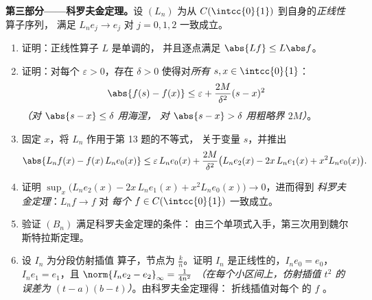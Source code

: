 \begin{problem}
\medskip
\noindent\textbf{第三部分——科罗夫金定理。}设 $(L_n)$
        为从 $C(\intcc{0}{1})$ 到自身的\emph{正线性}算子序列，
        满足 $L_ne_j \to e_j$
        对 $j = 0, 1, 2$ 一致成立。
\begin{enumerate}[resume]
  \item 证明：正线性算子 $L$ 是单调的，
        并且逐点满足 $\abs{Lf} \leq L\abs f$。
  \item 证明：对每个 $\varepsilon > 0$，存在 $\delta > 0$
        使得对\emph{所有} $s, x \in \intcc{0}{1}$：
        \[
        \abs{f(s) - f(x)} \leq \varepsilon +
        \frac{2M}{\delta^2}(s - x)^2
        \]
        \emph{（对 $\abs{s - x} \leq \delta$ 用海涅，
        对 $\abs{s-x} > \delta$ 用粗略界 $2M$）}。
  \item 固定 $x$，将 $L_n$ 作用于第 13 题的不等式，
        关于变量 $s$，并推出
        \[
        \abs{L_nf(x) - f(x)\,L_ne_0(x)}
        \leq \varepsilon\,L_ne_0(x) + \frac{2M}{\delta^2}
        \bigl(L_ne_2(x) - 2x\,L_ne_1(x) + x^2 L_ne_0(x)\bigr).
        \]
  \item 证明 $\sup_x \bigl(L_ne_2(x) - 2x\,L_ne_1(x) + x^2
        L_ne_0(x)\bigr) \to 0$，进而得到
        \emph{科罗夫金定理}：$L_nf \to f$ 对
        \emph{每个} $f \in C(\intcc{0}{1})$ 一致成立。
  \item 验证 $(B_n)$ 满足科罗夫金定理的条件：
        由三个单项式入手，第三次用到魏尔斯特拉斯定理。
  \item 设 $I_n$ 为分段仿射插值
        算子，节点为 $\frac kn$。证明 $I_n$
        是正线性的，$I_ne_0 = e_0$，$I_ne_1 = e_1$，且
        $\norm{I_ne_2 - e_2}_\infty = \frac{1}{4n^2}$
        \emph{（在每个小区间上，仿射插值 $t^2$ 的误差为
        $(t - a)(b - t)$）}。由科罗夫金定理得：
        折线插值对每个
        的 $f$ 。
\end{enumerate}


\end{problem}
